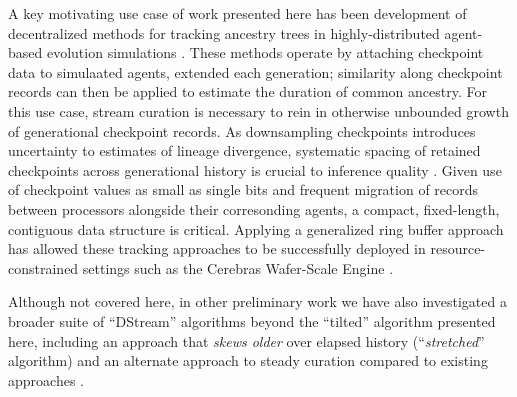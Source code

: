 A key motivating use case of work presented here has been development of decentralized methods for tracking ancestry trees in highly-distributed agent-based evolution simulations \citep{moreno2022hereditary}.
These methods operate by attaching checkpoint data to simulaated agents, extended each generation;
similarity along checkpoint records can then be applied to estimate the duration of common ancestry.
For this use case, stream curation is necessary to rein in otherwise unbounded growth of generational checkpoint records.
As downsampling checkpoints introduces uncertainty to estimates of lineage divergence, systematic spacing of retained checkpoints across generational history is crucial to inference quality \citet{moreno2024guide}.
Given use of checkpoint values as small as single bits and frequent migration of records between processors alongside their corresonding agents, a compact, fixed-length, contiguous data structure is critical.
Applying a generalized ring buffer approach has allowed these tracking approaches to be successfully deployed in resource-constrained settings such as the Cerebras Wafer-Scale Engine \citep{moreno2024trackable}.

Although not covered here, in other preliminary work we have also investigated a broader suite of ``DStream'' algorithms beyond the ``tilted'' algorithm presented here, including an approach that \textit{skews older} over elapsed history (``\textit{stretched}'' algorithm) and an alternate approach to steady curation compared to existing approaches \citep{moreno2024structured}.
